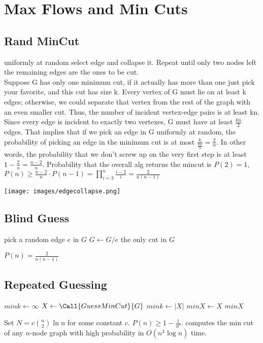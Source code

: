 \section{Max Flows and Min Cuts}
\subsection{Rand MinCut}
uniformly at random select edge and collapse it. Repeat until only two nodes left the remaining edges are the ones to be cut.\\
Suppose G has only one minimum cut, if it actually has more than one just pick your favorite, and this cut has size k. Every vertex of G must lie on at least k edges; otherwise, we could separate that vertex from the rest of the graph with an even smaller cut. Thus, the number of incident vertex-edge pairs is at least kn. Since every edge is incident to exactly two vertexes, G must have at least $\frac{kn}{2}$ edges. That implies that if we pick an edge in G uniformly at random, the probability of picking an edge in the minimum cut is at most $\frac{k}{\frac{kn}{2}}=\frac{2}{n}$. In other words, the probability that we don't screw up on the very first step is at least $1-\frac{2}{n}=\frac{n-2}{n}$.
Probability that the overall alg returns the mincut is 
$P(2)=1,$\\$P(n)\geq\frac{n-2}{n}\cdot P(n-1)=\prod_{i=3}^{n}\frac{i-2}{i}=\frac{2}{n(n-1)}$

\texttt{[image: images/edgecollapse.png]}
\subsection{Blind Guess}
\begin{algorithmic}[1]
			\State pick a random edge $e$ in $G$
			\State $G \gets G/e$
		\EndFor
		\State \Return the only cut in $G$
	\EndFunction
\end{algorithmic}
$P(n) = \frac{2}{n(n-1)}$

\subsection{Repeated Guessing}
\begin{algorithmic}[1]
		\State $mink \gets \infty$
			\State $X \gets \Call{GuessMinCut}{G}$
				\State $mink \gets \left|X\right|$
				\State $minX \gets X$
			\EndIf
		\EndFor
		\State \Return $minX$
	\EndFunction
\end{algorithmic}
Set $N = c \binom{n}{2} \ln n$ for some constant $c$. $P(n) \geq 1 - \frac{1}{n^c}$.  computes the min cut of any $n$-node graph with high probability in $O(n^4 \log n)$ time.


